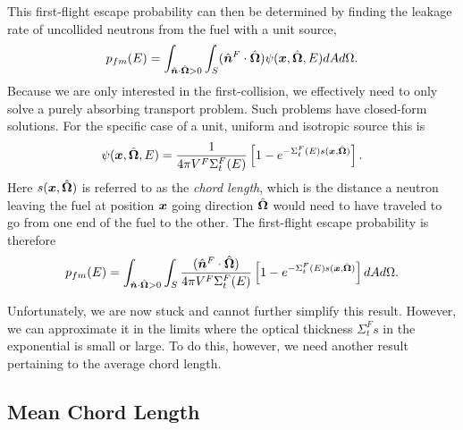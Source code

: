 This first-flight escape probability can then be determined by finding the leakage rate of uncollided neutrons from the fuel with a unit source,
\begin{align}
  p_{fm}(E) = \int_{ \hat{\bm{n}} \cdot \hat{\mathbf{\Omega}} > 0 } \int_S ( \hat{\bm{n}}^F \cdot \hat{\mathbf{\Omega}} ) \psi(\bm{x},\hat{\mathbf{\Omega}},E) dA d\Omega .
\end{align}
Because we are only interested in the first-collision, we effectively need to only solve a purely absorbing transport problem. Such problems have closed-form solutions. For the specific case of a unit, uniform and isotropic source this is
\begin{align}
  \psi(\bm{x},\hat{\mathbf{\Omega}},E) = \frac{1}{4\pi V^F \Sigma_t^F(E)} \left[ 1 - e^{-\Sigma_t^F(E) s(\bm{x},\hat{\mathbf{\Omega}})} \right] .
\end{align}
Here $s(\bm{x},\hat{\mathbf{\Omega}})$ is referred to as the \emph{chord length}, which is the distance a neutron leaving the fuel at position $\bm{x}$ going direction $\hat{\mathbf{\Omega}}$ would need to have traveled to go from one end of the fuel to the other. The first-flight escape probability is therefore
\begin{align}
  p_{fm}(E) = \int_{ \hat{\bm{n}} \cdot \hat{\mathbf{\Omega}} > 0 } \int_S \frac{ ( \hat{\bm{n}}^F \cdot \hat{\mathbf{\Omega}} ) }{4\pi V^F \Sigma_t^F(E)} \left[ 1 - e^{-\Sigma_t^F(E) s(\bm{x},\hat{\mathbf{\Omega}})} \right]  dA d\Omega . \label{Eq:libraryGeneration_firstFlightEscapeProbabilityGeneral}
\end{align} 

Unfortunately, we are now stuck and cannot further simplify this result. However, we can approximate it in the limits where the optical thickness $\Sigma_t^F s$ in the exponential is small or large. To do this, however, we need another result pertaining to the average chord length.




\subsection{Mean Chord Length}

